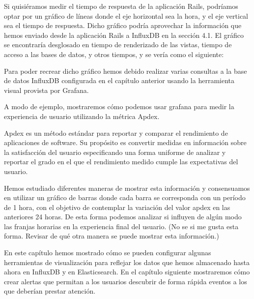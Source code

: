 Si quisiéramos medir el tiempo de respuesta de la aplicación Rails, podríamos optar por un gráfico de líneas donde el eje horizontal sea la hora, y el eje vertical sea el tiempo de respuesta. Dicho gráfico podría aprovechar la información que hemos enviado desde la aplicación Rails a InfluxDB en la sección 4.1. El gráfico se encontraría desglosado en tiempo de renderizado de las vistas, tiempo de acceso a las bases de datos, y otros tiempos, y se vería como el siguiente:


Para poder recrear dicho gráfico hemos debido realizar varias consultas a la base de datos InfluxDB configurada en el capítulo anterior usando la herramienta visual provista por Grafana.


A modo de ejemplo, mostraremos cómo podemos usar grafana para medir la experiencia de usuario utilizando la métrica Apdex.

Apdex es un método estándar para reportar y comparar el rendimiento de aplicaciones de software. Su propósito es convertir medidas en información sobre la satisfacción del usuario especificando una forma uniforme de analizar y reportar el grado en el que el rendimiento medido cumple las expectativas del usuario.


Hemos estudiado diferentes maneras de mostrar esta información y consensuamos en utilizar un gráfico de barras donde cada barra se corresponda con un período de 1 hora, con el objetivo de contemplar la variación del valor apdex en las anteriores 24 horas. De esta forma podemos analizar si influyen de algún modo las franjas horarias en la experiencia final del usuario. (No se si me gusta esta forma. Revisar de qué otra manera se puede mostrar esta información.)



En este capítulo hemos mostrado cómo se pueden configurar algunas herramientas de visualización para reflejar los datos que hemos almacenado hasta ahora en InfluxDB y en Elasticsearch. En el capítulo siguiente mostraremos cómo crear alertas que permitan a los usuarios descubrir de forma rápida eventos a los que deberían prestar atención.
